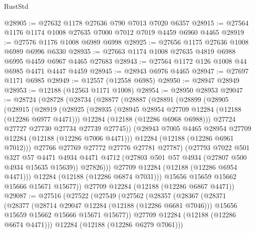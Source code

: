 \begin{lexlean}{RustStd}
\begin{coremodule}
@28905 := @27632 @1178 @27636 @790 @7013 @7020 @6357
@28915 := @27564 @1176 @1174 @1008 @27635 @7000 @7012 @7019 @4459 @6960 @4465
@28919 := @27576 @1176 @1008 @6989 @6998
@28925 := @27656 @1175 @27636 @1008 @6989 @6996 @6330
@28935 := @27663 @1174 @1008 @27635 @4819 @6988 @6995 @4459 @6967 @4465 @27683
@28943 := @27564 @1172 @126 @1008 @44 @6985 @4471 @4447 @4459
@28945 := @28943 @6976 @4465
@28947 := @27697 @1171 @6985
@28949 := @12557 (@12558 @6985)
@28950 := @28947 @28949
@28953 := @12188 (@12563 @1171 @1008)
@28954 := @28950 @28953
@29047 := @28724
    (@28728
      (@28734
        (@28877
          (@28887
            (@28891
              (@28899
                (@28905
                  (@28915
                    (@28919
                      (@28925
                        (@28935
                          (@28945 @28954 @27709 @12284 (@12188 (@12286 @6977 @4471)))
                          @12284
                          (@12188 (@12286 @6968 @6988)))
                        @27724
                        @27727
                        @27730
                        @27734
                        @27739
                        @27745))
                    (@28943 @7005 @4465 @28954 @27709 @12284 (@12188 (@12286 @7006 @4471)))
                    @12284
                    (@12188 (@12286 @6961 @7012)))
                  @27766
                  @27769
                  @27772
                  @27776
                  @27781
                  @27787)
                (@27793
                  @7022
                  @501
                  @327
                  @57
                  @4471
                  @4934
                  @4471
                  @4712
                  (@27803 @501 @57 @4934 (@27807 @500 @4934 @15635 @15639))
                  @27826)))
            @27709
            @12284
            (@12188 (@12286 @6954 @4471)))
          @12284
          (@12188 (@12286 @6874 @7031)))
        @15656
        @15659
        @15662
        @15666
        @15671
        @15677))
    @27709
    @12284
    (@12188 (@12286 @6867 @4471))
@29087 := @27516
    (@27522
      (@27549
        (@27562
          (@28357
            (@28367
              (@28371
                (@28377
                  (@28714 @29047 @12284 (@12188 (@12286 @6681 @7046)))
                  @15656
                  @15659
                  @15662
                  @15666
                  @15671
                  @15677))
              @27709
              @12284
              (@12188 (@12286 @6674 @4471)))
            @12284
            (@12188 (@12286 @6279 @7061)))

\end{coremodule}
\end{lexlean}
